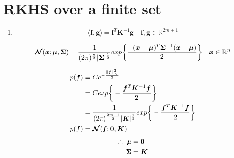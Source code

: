 \documentclass{article}
\begin{document}
\section{RKHS over a finite set}
\begin{enumerate}
    \item 
        
        \[\langle \bm{f}, \bm{g} \rangle = \bm{f}^T\bm{K}^{-1}\bm{g}\quad
        \bm{f},\bm{g} \in \mathbb{R}^{2m+1}\]

        \begin{equation}
            \boldsymbol{\mathcal{N}}(\bm{x};\bm{\mu},\bm{\Sigma} ) 
            = \frac{1}{(2\pi)^\frac{n}{2}|\bm{\Sigma}|^\frac{1}{2}}
            exp\bigg\{\frac{-(\bm{x}-\bm{\mu})^T\bm{\Sigma^}{-1}(\bm{x}-\bm{\mu})}{2} \bigg\} \notag
            \quad \bm{x} \in \mathbb{R}^{n}
        \end{equation}
        
        
        \begin{equation}
            \begin{aligned}
                p(\bm{f}) &= Ce^{-\frac{\|\bm{f}\|^{2}_H}{2}} \\
                &= C exp \bigg\{ -\frac{\bm{f}^T\bm{K}^{-1}\bm{f}}{2} \bigg\} \notag \\
                &= \frac{1}{(2\pi)^\frac{2m+1}{2}|\bm{K}|^\frac{1}{2}}
                   exp \bigg\{ -\frac{\bm{f}^T\bm{K}^{-1}\bm{f}}{2} \bigg\} \notag \\
                p(\bm{f}) &= \boldsymbol{\mathcal{N}}(\bm{f}; \bm{0}, \bm{K})
            \end{aligned}
        \end{equation}
        \begin{equation}
            \begin{aligned}
                \therefore\ \bm{\mu} &= \bm{0} \notag \\
                \bm{\Sigma} &= \bm{K}
            \end{aligned} 
        \end{equation}


\end{enumerate}
\end{document}
